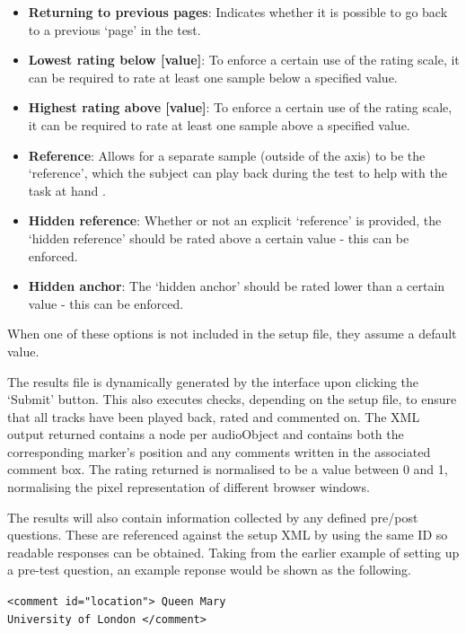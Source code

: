 \documentclass{article}
\begin{document}
\begin{itemize}
\item \textbf{Returning to previous pages}: Indicates whether it is possible to go back to a previous `page' in the test. 
\item \textbf{Lowest rating below [value]}: To enforce a certain use of the rating scale, it can be required to rate at least one sample below a specified value. 
\item \textbf{Highest rating above [value]}: To enforce a certain use of the rating scale, it can be required to rate at least one sample above a specified value. 
\item \textbf{Reference}: Allows for a separate sample (outside of the axis) to be the `reference', which the subject can play back during the test to help with the task at hand \cite{mushra}. 
\item \textbf{Hidden reference}: Whether or not an explicit `reference' is provided, the `hidden reference' should be rated above a certain value \cite{mushra} - this can be enforced. 
\item \textbf{Hidden anchor}: The `hidden anchor' should be rated lower than a certain value \cite{mushra} - this can be enforced. 

\end{itemize}

When one of these options is not included in the setup file, they assume a default value. 


The results file is dynamically generated by the interface upon clicking the `Submit' button. This also executes checks, depending on the setup file, to ensure that all tracks have been played back, rated and commented on. The XML output returned contains a node per audioObject and contains both the corresponding marker's position and any comments written in the associated comment box. The rating returned is normalised to be a value between 0 and 1, normalising the pixel representation of different browser windows.

The results will also contain information collected by any defined pre/post questions. These are referenced against the setup XML by using the same ID so readable responses can be obtained. Taking from the earlier example of setting up a pre-test question, an example reponse would be shown as the following.

\texttt{<comment id="location"> Queen Mary \\University of London </comment>}
\end{document}
